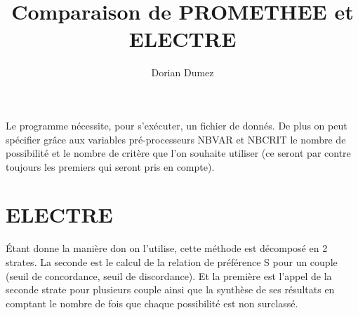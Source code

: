 \documentclass[12pt,a4paper]{article}
\title{Comparaison de PROMETHEE et ELECTRE}
\author{Dorian Dumez}
\begin{document}
\maketitle

Le programme nécessite, pour s'exécuter, un fichier de donnés. De plus on peut spécifier grâce aux variables pré-processeurs NBVAR et NBCRIT le nombre de possibilité et le nombre de critère que l'on souhaite utiliser (ce seront par contre toujours les premiers qui seront pris en compte).\\

\section{ELECTRE}

Étant donne la manière don on l'utilise, cette méthode est décomposé en 2 strates. La seconde est le calcul de la relation de préférence S pour un couple (seuil de concordance, seuil de discordance). Et la première est l'appel de la seconde strate pour plusieurs couple ainsi que la synthèse de ses résultats en comptant le nombre de fois que chaque possibilité est non surclassé.\\
\end{document}
